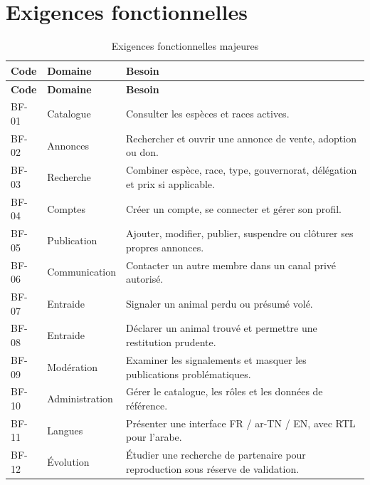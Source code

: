\section{Exigences fonctionnelles}\label{sec:besoins}
\begin{longtable}{@{}P{20mm}P{34mm}P{85mm}@{}}\caption{Exigences fonctionnelles majeures}\label{tab:besoins}\\
\toprule\textbf{Code} & \textbf{Domaine} & \textbf{Besoin}\\\midrule\endfirsthead
\toprule\textbf{Code} & \textbf{Domaine} & \textbf{Besoin}\\\midrule\endhead
BF-01 & Catalogue & Consulter les espèces et races actives.\\
BF-02 & Annonces & Rechercher et ouvrir une annonce de vente, adoption ou don.\\
BF-03 & Recherche & Combiner espèce, race, type, gouvernorat, délégation et prix si applicable.\\
BF-04 & Comptes & Créer un compte, se connecter et gérer son profil.\\
BF-05 & Publication & Ajouter, modifier, publier, suspendre ou clôturer ses propres annonces.\\
BF-06 & Communication & Contacter un autre membre dans un canal privé autorisé.\\
BF-07 & Entraide & Signaler un animal perdu ou présumé volé.\\
BF-08 & Entraide & Déclarer un animal trouvé et permettre une restitution prudente.\\
BF-09 & Modération & Examiner les signalements et masquer les publications problématiques.\\
BF-10 & Administration & Gérer le catalogue, les rôles et les données de référence.\\
BF-11 & Langues & Présenter une interface FR / ar-TN / EN, avec RTL pour l’arabe.\\
BF-12 & Évolution & Étudier une recherche de partenaire pour reproduction sous réserve de validation.\\
\bottomrule
\end{longtable}

